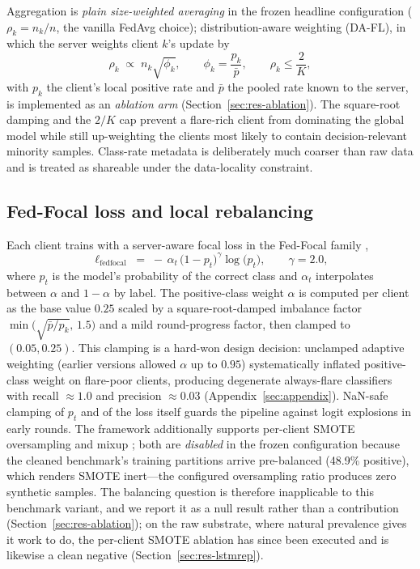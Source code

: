 Aggregation is \emph{plain size-weighted averaging} in the frozen
headline configuration ($\rho_k = n_k/n$, the vanilla FedAvg
choice); distribution-aware weighting (DA-FL), in which the server
weights client $k$'s update by
\begin{equation}\label{eq:dafl}
    \rho_k \;\propto\; n_k \sqrt{\phi_k},
    \qquad
    \phi_k = \frac{p_k}{\bar{p}},
    \qquad
    \rho_k \le \frac{2}{K},
\end{equation}
with $p_k$ the client's local positive rate and $\bar{p}$ the pooled
rate known to the server, is implemented as an \emph{ablation arm}
(Section~\ref{sec:res-ablation}). The square-root damping and the
$2/K$ cap prevent a flare-rich client from dominating the global
model while still up-weighting the clients most likely to contain
decision-relevant minority samples. Class-rate metadata is
deliberately much coarser than raw data and is treated as shareable
under the data-locality constraint.

\subsection{Fed-Focal loss and local rebalancing}

Each client trains with a server-aware focal loss in the Fed-Focal
family \cite{sarkar2020},
\begin{equation}\label{eq:focal}
    \ell_{\mathrm{fedfocal}}
    \;=\; -\,\alpha_t\,\bigl(1 - p_t\bigr)^{\gamma}
    \log\bigl(p_t\bigr),
    \qquad \gamma = 2.0,
\end{equation}
where $p_t$ is the model's probability of the correct class and
$\alpha_t$ interpolates between $\alpha$ and $1-\alpha$ by label. The
positive-class weight $\alpha$ is computed per client as the base value
$0.25$ \cite{lin2017} scaled by a square-root-damped imbalance factor
$\min\!\big(\sqrt{\bar{p}/p_k},\,1.5\big)$ and a mild round-progress
factor, then clamped to $(0.05, 0.25)$. This clamping is a hard-won
design decision: unclamped adaptive weighting (earlier versions allowed
$\alpha$ up to $0.95$) systematically inflated positive-class weight on
flare-poor clients, producing degenerate always-flare classifiers with
recall $\approx 1.0$ and precision $\approx 0.03$
(Appendix~\ref{sec:appendix}). NaN-safe clamping of $p_t$ and of the
loss itself guards the pipeline against logit explosions in early
rounds. The framework additionally supports per-client SMOTE
oversampling \cite{chawla2002} and mixup \cite{zhang2018}; both are
\emph{disabled} in the frozen configuration because the cleaned
benchmark's training partitions arrive pre-balanced (48.9\% positive),
which renders SMOTE inert---the configured oversampling ratio produces
zero synthetic samples. The balancing question is therefore
inapplicable to this benchmark variant, and we report it as a null
result rather than a contribution (Section~\ref{sec:res-ablation});
on the raw substrate, where natural prevalence gives it work to do,
the per-client SMOTE ablation has since been executed and is
likewise a clean negative (Section~\ref{sec:res-lstmrep}).

